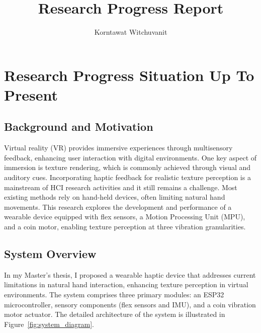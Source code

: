 \documentclass[graybox]{svmult}
\begin{document}
\title*{\centering Research Progress Report}

\author{\hfill Korntawat Witchuvanit}


\maketitle
\vspace{-120pt} 

\section{Research Progress Situation Up To Present}\label{sec:Present Research}



\subsection{Background and Motivation}\label{sec:BG}
Virtual reality (VR) provides immersive experiences through multisensory feedback, enhancing user interaction with digital environments. One key aspect of immersion is texture rendering, which is commonly achieved through visual and auditory cues. Incorporating haptic feedback for realistic texture perception is a mainstream of HCI research activities and it still remains a challenge. Most existing methods rely on hand-held devices, often limiting natural hand movements. This research explores the development and performance of a wearable device equipped with flex sensors, a Motion Processing Unit (MPU), and a coin motor, enabling texture perception at three vibration granularities.

\subsection{System Overview}
\label{sec:System Overview}
In my Master's thesis, I proposed a wearable haptic device that addresses current limitations in natural hand interaction, enhancing texture perception in virtual environments. The system comprises three primary modules: an ESP32 microcontroller, sensory components (flex sensors and IMU), and a coin vibration motor actuator. The detailed architecture of the system is illustrated in Figure~\ref{fig:system_diagram}.
\end{document}
